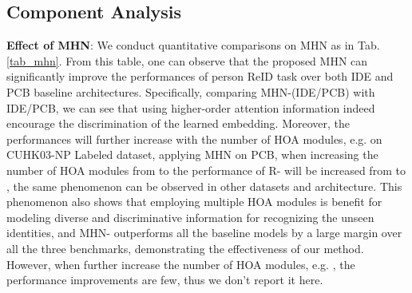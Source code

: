\documentclass[10pt,twocolumn,letterpaper]{article}
\begin{document}
\subsection{Component Analysis}
\textbf{Effect of MHN}: We conduct quantitative comparisons on MHN as in Tab. \ref{tab_mhn}. From this table, one can observe that the proposed MHN can significantly improve the performances of person ReID task over both IDE and PCB baseline architectures. Specifically, comparing MHN-(IDE/PCB) with IDE/PCB, we can see that using higher-order attention information indeed encourage the discrimination of the learned embedding. Moreover, the performances will further increase with the number of HOA modules, e.g. on CUHK03-NP Labeled dataset, applying MHN on PCB, when increasing the number of HOA modules from  to  the performance of R- will be increased from  to , the same phenomenon can be observed in other datasets and architecture. This phenomenon also shows that employing multiple HOA modules is benefit for modeling diverse and discriminative information for recognizing the unseen identities, and MHN- outperforms all the baseline models by a large margin over all the three benchmarks, demonstrating the effectiveness of our method. However, when further increase the number of HOA modules, e.g. , the performance improvements are few, thus we don't report it here. \begin{table}[t!]
  \centering
      \caption{Effect (\%) of adversary constraint.  indicates the re-implementation by our code.}

\end{table}
\end{document}

